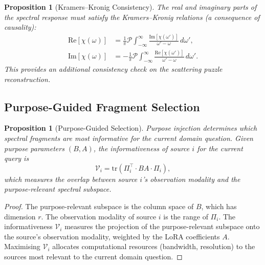 \documentclass[11pt,twocolumn,a4paper]{article}
\newtheorem{proposition}[theorem]{Proposition}
\theoremstyle{definition}
\theoremstyle{remark}
\begin{document}
\begin{proposition}[Kramers--Kronig Consistency]\label{prop:kramers-kronig}
The real and imaginary parts of the spectral response must satisfy the Kramers--Kronig relations (a consequence of causality):
\begin{align}
    \mathrm{Re}[\chi(\omega)] &= \frac{1}{\pi} \mathcal{P}\!\int_{-\infty}^{\infty} \frac{\mathrm{Im}[\chi(\omega')]}{\omega' - \omega} \, d\omega', \label{eq:KK-real}\\
    \mathrm{Im}[\chi(\omega)] &= -\frac{1}{\pi} \mathcal{P}\!\int_{-\infty}^{\infty} \frac{\mathrm{Re}[\chi(\omega')]}{\omega' - \omega} \, d\omega'. \label{eq:KK-imag}
\end{align}
This provides an additional consistency check on the scattering puzzle reconstruction.
\end{proposition}

\subsection{Purpose-Guided Fragment Selection}

\begin{proposition}[Purpose-Guided Selection]\label{prop:purpose-guided}
Purpose injection determines which spectral fragments are most informative for the current domain question.  Given purpose parameters $(B, A)$, the informativeness of source $i$ for the current query is
\begin{equation}\label{eq:informativeness}
    \mathcal{V}_i = \mathrm{tr}\!\left(\Pi_i^\top \cdot BA \cdot \Pi_i\right),
\end{equation}
which measures the overlap between source $i$'s observation modality and the purpose-relevant spectral subspace.
\end{proposition}

\begin{proof}
The purpose-relevant subspace is the column space of $B$, which has dimension $r$.  The observation modality of source $i$ is the range of $\Pi_i$.  The informativeness $\mathcal{V}_i$ measures the projection of the purpose-relevant subspace onto the source's observation modality, weighted by the LoRA coefficients $A$.  Maximising $\mathcal{V}_i$ allocates computational resources (bandwidth, resolution) to the sources most relevant to the current domain question.
\end{proof}
\end{document}
